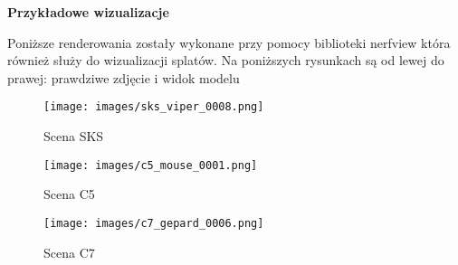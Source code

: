\textbf{Przykładowe wizualizacje}

Poniższe renderowania zostały wykonane przy pomocy biblioteki nerfview która również służy do wizualizacji splatów. Na poniższych rysunkach są od lewej do prawej: prawdziwe zdjęcie i widok modelu

\begin{figure}[!h]
    \centering
    \texttt{[image: images/sks\_viper\_0008.png]}
    \caption{Scena SKS}
    \label{fig:sks_gs}
\end{figure}

\begin{figure}[!h]
    \centering
    \texttt{[image: images/c5\_mouse\_0001.png]}
    \caption{Scena C5}
    \label{fig:c5_gs}
\end{figure}

\begin{figure}[!h]
    \centering
    \texttt{[image: images/c7\_gepard\_0006.png]}
    \caption{Scena C7}
    \label{fig:c7_gs}
\end{figure}